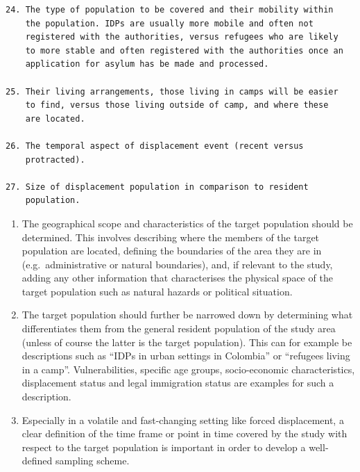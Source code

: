 \documentclass[
]{article}
\begin{document}
\begin{verbatim}
24. The type of population to be covered and their mobility within
    the population. IDPs are usually more mobile and often not
    registered with the authorities, versus refugees who are likely
    to more stable and often registered with the authorities once an
    application for asylum has be made and processed.

25. Their living arrangements, those living in camps will be easier
    to find, versus those living outside of camp, and where these
    are located.

26. The temporal aspect of displacement event (recent versus
    protracted).

27. Size of displacement population in comparison to resident
    population.
\end{verbatim}

\begin{enumerate}
\def\labelenumi{\arabic{enumi}.}
\setcounter{enumi}{138}
\item
  The geographical scope and characteristics of the target population
  should be determined. This involves describing where the members of
  the target population are located, defining the boundaries of the
  area they are in (e.g.~administrative or natural boundaries), and,
  if relevant to the study, adding any other information that
  characterises the physical space of the target population such as
  natural hazards or political situation.
\item
  The target population should further be narrowed down by
  determining what differentiates them from the general resident
  population of the study area (unless of course the latter is the
  target population). This can for example be descriptions such as
  ``IDPs in urban settings in Colombia'' or ``refugees living in a camp''.
  Vulnerabilities, specific age groups, socio-economic
  characteristics, displacement status and legal immigration status
  are examples for such a description.
\item
  Especially in a volatile and fast-changing setting like forced
  displacement, a clear definition of the time frame or point in time
  covered by the study with respect to the target population is
  important in order to develop a well-defined sampling scheme.
\end{enumerate}

\hypertarget{section-2}{%
\subsubsection{}\label{section-2}}
\end{document}

